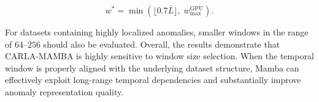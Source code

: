 \documentclass[runningheads]{llncs}
\begin{document}
\[
w^* = \min(\lfloor 0.7\bar{L} \rfloor,\; w_{\max}^{\text{GPU}}).
\]

For datasets containing highly localized anomalies, smaller windows in the range of $64$--$256$ should also be evaluated. Overall, the results demonstrate that CARLA-MAMBA is highly sensitive to window size selection. When the temporal window is properly aligned with the underlying dataset structure, Mamba can effectively exploit long-range temporal dependencies and substantially improve anomaly representation quality.

\begin{table}[htbp]
\centering
\caption{Validation of the proposed window size heuristic on seven benchmark datasets.}
\label{tab:window_heuristic}
\end{table}
\end{document}
